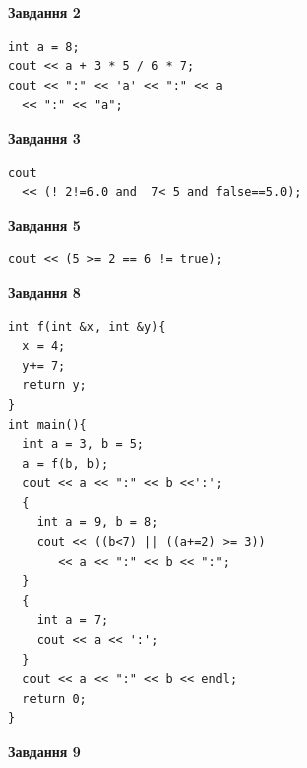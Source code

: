 \documentclass[12pt, ukrainian]{article}
\begin{document}
{\begin {large}
\begin{minipage}[t]{7.0cm}
\end{minipage}
\vline \hspace{1mm}
\begin{minipage}[t]{11.0cm}

\begin{center}
\textbf{Завдання 2}
\end{center}
\vspace{-8mm}

\begin{verbatim}
int a = 8;
cout << a + 3 * 5 / 6 * 7;
cout << ":" << 'a' << ":" << a 
  << ":" << "a";
\end{verbatim}



\begin{center}
\textbf{Завдання 3}
\end{center}
\vspace{-8mm}

\begin{verbatim}
cout 
  << (! 2!=6.0 and  7< 5 and false==5.0);
\end{verbatim}



\begin{center}
\textbf{Завдання 5}
\end{center}
\vspace{-8mm}

\begin{verbatim}
cout << (5 >= 2 == 6 != true);
\end{verbatim}



\begin{center}
\textbf{Завдання 8}
\end{center}
\vspace{-8mm}

\begin{verbatim}
int f(int &x, int &y){
  x = 4;
  y+= 7;
  return y;
}
int main(){
  int a = 3, b = 5;
  a = f(b, b);
  cout << a << ":" << b <<':';
  {
    int a = 9, b = 8;
    cout << ((b<7) || ((a+=2) >= 3))
       << a << ":" << b << ":";
  }
  {
    int a = 7;
    cout << a << ':';
  }
  cout << a << ":" << b << endl;
  return 0;
}
\end{verbatim}

\end{minipage}


\begin{minipage}[t]{7.0cm}

\begin{center}
\textbf{Завдання 9}
\end{center}
\vspace{-8mm}


\end{minipage}
\end{large}}
\end{document}
